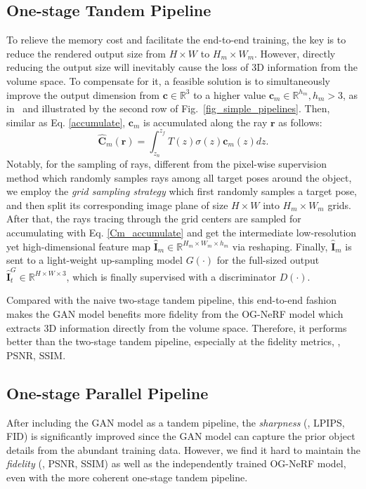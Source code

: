 \subsection{\textbf{One-stage Tandem Pipeline}}
\label{sec:otp}
To relieve the memory cost and facilitate the end-to-end training, the key is to reduce the rendered output size from $H \times W$ to $H_m \times W_m$. However, directly reducing the output size will inevitably cause the loss of 3D information from the volume space. To compensate for it, a feasible solution is to simultaneously improve the output dimension from $\textbf{c} \in \mathbb{R}^3$ to a higher value $\textbf{c}_m \in \mathbb{R}^{h_m}, h_m > 3$, as in~\cite{GIRAFFE_niemeyer2021giraffe} and illustrated by the second row of Fig.~\ref{fig_simple_pipelines}. Then, similar as Eq. \ref{accumulate}, $\textbf{c}_m$ is accumulated along the ray $\textbf{r}$ as follows:
\begin{equation}
\label{Cm_accumulate}
    \hat{\textbf{C}}_m(\textbf{r}) = \int_{z_n}^{z_f} T(z) \sigma (z) \textbf{c}_m(z) dz.
\end{equation}
Notably, for the sampling of rays, different from the pixel-wise supervision method \cite{PixelNeRF_yu2021pixelnerf} which randomly samples rays among all target poses around the object, we employ the \textit{grid sampling strategy} which first randomly samples a target pose, and then split its corresponding image plane of size $H \times W$ into $H_m \times W_m$ grids. After that, the rays tracing through the grid centers are sampled for accumulating with Eq. \ref{Cm_accumulate} and get the intermediate low-resolution yet high-dimensional feature map $\hat{\textbf{I}}_m \in \mathbb{R}^{H_m \times W_m \times h_m}$ via reshaping. 
Finally, $\hat{\textbf{I}}_m$ is sent to a light-weight up-sampling model $G(\cdot)$ for the full-sized output $ \hat{\textbf{I}}_t^{G} \in \mathbb{R}^ {H \times W \times 3}$, which is finally supervised with a discriminator $D(\cdot)$. 

Compared with the naive two-stage tandem pipeline, this end-to-end fashion makes the GAN model benefits more fidelity from the OG-NeRF model which extracts 3D information directly from the volume space. Therefore, it performs better than the two-stage tandem pipeline, especially at the fidelity metrics, \eg, PSNR, SSIM. 

\vspace{-2mm}
\subsection{\textbf{One-stage Parallel Pipeline}}
\label{sec:opp}
After including the GAN model as a tandem pipeline, the \textit{sharpness} (\eg, LPIPS, FID) is significantly improved since the GAN model can capture the prior object details from the abundant training data. However, we find it hard to maintain the \textit{fidelity} (\eg, PSNR, SSIM) as well as the independently trained OG-NeRF model, even with the more coherent one-stage tandem pipeline. 



